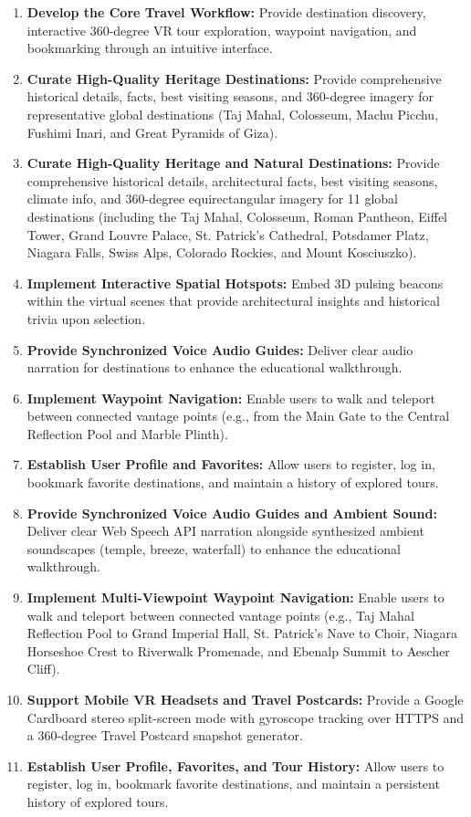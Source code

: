 \documentclass{tietreport}
\begin{document}
\begin{enumerate}
  \item \textbf{Develop the Core Travel Workflow:} Provide destination discovery, interactive 360-degree VR tour exploration, waypoint navigation, and bookmarking through an intuitive interface.
  \item \textbf{Curate High-Quality Heritage Destinations:} Provide comprehensive historical details, facts, best visiting seasons, and 360-degree imagery for representative global destinations (Taj Mahal, Colosseum, Machu Picchu, Fushimi Inari, and Great Pyramids of Giza).
  \item \textbf{Curate High-Quality Heritage and Natural Destinations:} Provide comprehensive historical details, architectural facts, best visiting seasons, climate info, and 360-degree equirectangular imagery for 11 global destinations (including the Taj Mahal, Colosseum, Roman Pantheon, Eiffel Tower, Grand Louvre Palace, St. Patrick's Cathedral, Potsdamer Platz, Niagara Falls, Swiss Alps, Colorado Rockies, and Mount Kosciuszko).
  \item \textbf{Implement Interactive Spatial Hotspots:} Embed 3D pulsing beacons within the virtual scenes that provide architectural insights and historical trivia upon selection.
  \item \textbf{Provide Synchronized Voice Audio Guides:} Deliver clear audio narration for destinations to enhance the educational walkthrough.
  \item \textbf{Implement Waypoint Navigation:} Enable users to walk and teleport between connected vantage points (e.g., from the Main Gate to the Central Reflection Pool and Marble Plinth).
  \item \textbf{Establish User Profile and Favorites:} Allow users to register, log in, bookmark favorite destinations, and maintain a history of explored tours.
  \item \textbf{Provide Synchronized Voice Audio Guides and Ambient Sound:} Deliver clear Web Speech API narration alongside synthesized ambient soundscapes (temple, breeze, waterfall) to enhance the educational walkthrough.
  \item \textbf{Implement Multi-Viewpoint Waypoint Navigation:} Enable users to walk and teleport between connected vantage points (e.g., Taj Mahal Reflection Pool to Grand Imperial Hall, St. Patrick's Nave to Choir, Niagara Horseshoe Crest to Riverwalk Promenade, and Ebenalp Summit to Aescher Cliff).
  \item \textbf{Support Mobile VR Headsets and Travel Postcards:} Provide a Google Cardboard stereo split-screen mode with gyroscope tracking over HTTPS and a 360-degree Travel Postcard snapshot generator.
  \item \textbf{Establish User Profile, Favorites, and Tour History:} Allow users to register, log in, bookmark favorite destinations, and maintain a persistent history of explored tours.
\end{enumerate}
\end{document}
